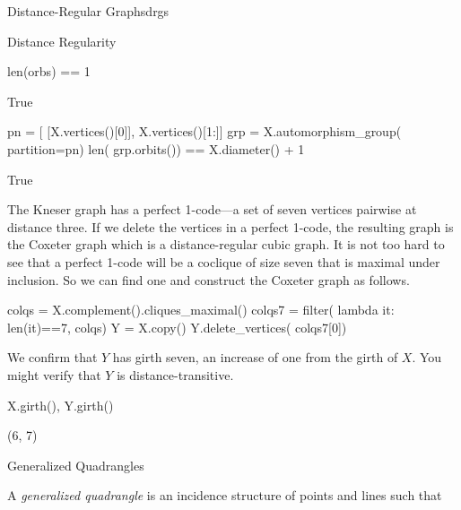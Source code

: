\begin{chap}{Distance-Regular Graphs}{drgs}
\begin{sect}{Distance Regularity}
\begin{sagecode}
\begin{sageinput}
len(orbs) == 1 
\end{sageinput}
\begin{sageoutput}
True
\end{sageoutput}
\end{sagecode}
%
\begin{sagecode}
\begin{sageinput}
pn = [ [X.vertices()[0]], X.vertices()[1:]]
grp = X.automorphism_group( partition=pn)
len( grp.orbits()) == X.diameter() + 1
\end{sageinput}
\begin{sageoutput}
True
\end{sageoutput}
\end{sagecode}
%
\begin{para}
The Kneser graph has a perfect 1-code---a set of seven vertices pairwise at distance
three. If we delete the vertices in a perfect 1-code, the resulting graph
is the Coxeter graph which is a distance-regular cubic graph.
It is not too hard to see that a perfect 1-code will be a coclique of size seven
that is maximal under inclusion. So we can find one and construct the
Coxeter graph as follows.
\end{para}
%
\begin{sagecode}
\begin{sageinput}
colqs = X.complement().cliques_maximal()
colqs7 = filter( lambda it: len(it)==7, colqs)
Y = X.copy()
Y.delete_vertices( colqs7[0])
\end{sageinput}
\end{sagecode}
%
\begin{para}
We confirm that $Y$ has girth seven, an increase of one from the girth of $X$.  You might verify that $Y$ is distance-transitive.
\end{para}
%
\begin{sagecode}
\begin{sageinput}
X.girth(), Y.girth()
\end{sageinput}
\begin{sageoutput}
(6, 7)
\end{sageoutput}
\end{sagecode}
%
\end{sect}
%
\begin{sect}{Generalized Quadrangles}
%
\begin{para}
A \textsl{generalized quadrangle} is an incidence structure of points
and lines such that
\end{para}
%
\begin{enumerate}
    \begin{listitem}

\end{listitem}
\end{enumerate}
\end{sect}
\end{chap}
